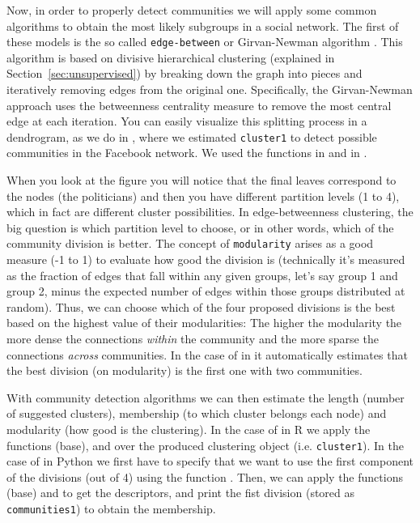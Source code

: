 
Now, in order to properly detect communities we will apply some common algorithms to obtain the most likely subgroups in a social network. The first of these models is the so called \texttt{edge-between} or Girvan-Newman algorithm \citep{newman2004finding}. This algorithm is based on divisive hierarchical clustering (explained in Section~\ref{sec:unsupervised}) by breaking down the graph into pieces and iteratively removing edges from the original one. Specifically,  the Girvan-Newman approach uses the betweenness centrality measure to remove the most central edge at each iteration. You can easily visualize this splitting process in a dendrogram, as we do in , where we estimated \texttt{cluster1} to detect possible communities in the Facebook network. We used the functions  in  and  in .


When you look at the figure you will notice that the final leaves correspond to the nodes (the politicians) and then you have different partition levels (1 to 4), which in fact are different cluster possibilities. In edge-betweenness clustering, the big question is which partition level to choose, or in other words, which of the community division is better. The concept of \texttt{modularity} arises as a good measure (-1 to 1) to evaluate how good the division is (technically it's measured as the fraction of edges that fall within any given groups, let's say group 1 and group 2, minus the expected number of edges within those groups distributed at random). Thus, we can choose which of the four proposed divisions is the best based on the highest value of their modularities: The higher the modularity the more dense the connections \textit{within} the community and the more sparse the connections \textit{across} communities. In the case of  in  it automatically estimates that the best division (on modularity) is the first one with two communities.


With community detection algorithms we can then estimate the length (number of suggested clusters), membership (to which cluster belongs each node) and modularity (how good is the clustering). In the case of  in R we apply the functions  (base),  and  over the produced clustering object (i.e. \texttt{cluster1}). In the case of  in Python we first have to specify that we want to use the first component of the divisions (out of 4) using the function . Then, we can apply the functions  (base) and  to get the descriptors, and print the fist division (stored as \texttt{communities1}) to obtain the membership.

